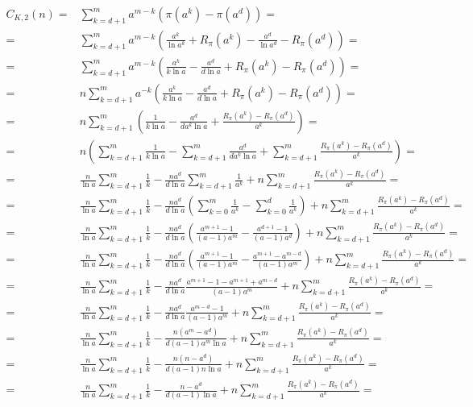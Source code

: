 \documentclass{article}
\begin{document}
\begin{align*}
C_{K,2}(n) =& \sum_{k=d+1}^{m} a^{m-k} \left( \pi(a^k) - \pi(a^d) \right) = \\
=& \sum_{k=d+1}^{m} a^{m-k} \left( \frac{a^k}{\ln{a^k}} + R_{\pi}(a^k) - \frac{a^d}{\ln{a^d}} - R_{\pi}(a^d) \right) = \\
=& \sum_{k=d+1}^{m} a^{m-k} \left( \frac{a^k}{k \ln{a}} - \frac{a^d}{d \ln{a}} + R_{\pi}(a^k) - R_{\pi}(a^d) \right) = \\
=& n \sum_{k=d+1}^{m} a^{-k} \left( \frac{a^k}{k \ln{a}} - \frac{a^d}{d \ln{a}} + R_{\pi}(a^k) - R_{\pi}(a^d) \right) = \\
=& n \sum_{k=d+1}^{m} \left( \frac{1}{k \ln{a}} - \frac{a^d}{d a^k \ln{a}} + \frac{R_{\pi}(a^k) - R_{\pi}(a^d)}{a^k} \right) = \\
=& n \left( \sum_{k=d+1}^{m} \frac{1}{k \ln{a}} - \sum_{k=d+1}^{m} \frac{a^d}{d a^k \ln{a}} + \sum_{k=d+1}^{m} \frac{R_{\pi}(a^k) - R_{\pi}(a^d)}{a^k} \right) = \\
=& \frac{n}{\ln{a}} \sum_{k=d+1}^{m} \frac{1}{k} - \frac{n a^d}{d \ln{a}} \sum_{k=d+1}^{m} \frac{1}{a^k} + n \sum_{k=d+1}^{m} \frac{R_{\pi}(a^k) - R_{\pi}(a^d)}{a^k} = \\
=& \frac{n}{\ln{a}} \sum_{k=d+1}^{m} \frac{1}{k} - \frac{n a^d}{d \ln{a}} \left( \sum_{k=0}^{m} \frac{1}{a^k} - \sum_{k=0}^{d} \frac{1}{a^k} \right) + n \sum_{k=d+1}^{m} \frac{R_{\pi}(a^k) - R_{\pi}(a^d)}{a^k} = \\
=& \frac{n}{\ln{a}} \sum_{k=d+1}^{m} \frac{1}{k} - \frac{n a^d}{d \ln{a}} \left( \frac{a^{m+1}-1}{(a-1)a^m} - \frac{a^{d+1}-1}{(a-1)a^d} \right) + n \sum_{k=d+1}^{m} \frac{R_{\pi}(a^k) - R_{\pi}(a^d)}{a^k} = \\
=& \frac{n}{\ln{a}} \sum_{k=d+1}^{m} \frac{1}{k} - \frac{n a^d}{d \ln{a}} \left( \frac{a^{m+1}-1}{(a-1)a^m} - \frac{a^{m+1}-a^{m-d}}{(a-1)a^m} \right) + n \sum_{k=d+1}^{m} \frac{R_{\pi}(a^k) - R_{\pi}(a^d)}{a^k} = \\
=& \frac{n}{\ln{a}} \sum_{k=d+1}^{m} \frac{1}{k} - \frac{n a^d}{d \ln{a}} \frac{a^{m+1}-1-a^{m+1}+a^{m-d}}{(a-1)a^m} + n \sum_{k=d+1}^{m} \frac{R_{\pi}(a^k) - R_{\pi}(a^d)}{a^k} = \\
=& \frac{n}{\ln{a}} \sum_{k=d+1}^{m} \frac{1}{k} - \frac{n a^d}{d \ln{a}} \frac{a^{m-d}-1}{(a-1)a^m} + n \sum_{k=d+1}^{m} \frac{R_{\pi}(a^k) - R_{\pi}(a^d)}{a^k} = \\
=& \frac{n}{\ln{a}} \sum_{k=d+1}^{m} \frac{1}{k} - \frac{n ( a^m - a^d )}{d (a-1) a^m \ln{a}} + n \sum_{k=d+1}^{m} \frac{R_{\pi}(a^k) - R_{\pi}(a^d)}{a^k} = \\
=& \frac{n}{\ln{a}} \sum_{k=d+1}^{m} \frac{1}{k} - \frac{n ( n - a^d )}{d (a-1) n \ln{a}} + n \sum_{k=d+1}^{m} \frac{R_{\pi}(a^k) - R_{\pi}(a^d)}{a^k} = \\
=& \frac{n}{\ln{a}} \sum_{k=d+1}^{m} \frac{1}{k} - \frac{n - a^d}{d (a-1) \ln{a}} + n \sum_{k=d+1}^{m} \frac{R_{\pi}(a^k) - R_{\pi}(a^d)}{a^k} = \\
\end{align*}
\end{document}
